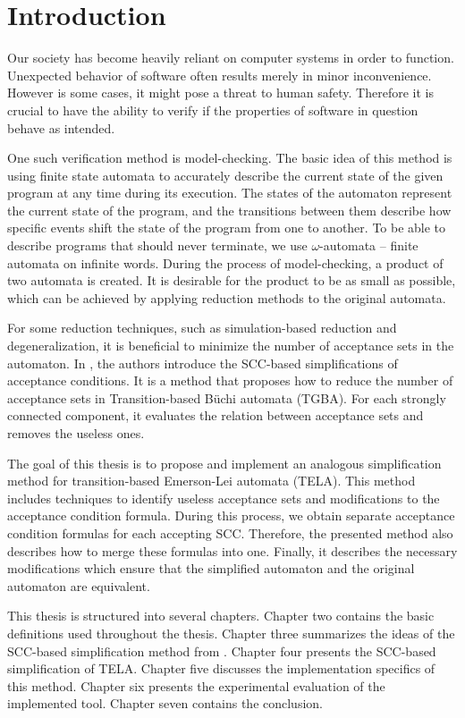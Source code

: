 \documentclass[
  digital, %
  twoside, %
  table,   %
  lof,     %
  lot,     %
]{fithesis3}
\begin{document}
\chapter{Introduction}

Our society has become heavily reliant on computer systems in order to function. Unexpected behavior of software often results merely in minor inconvenience. However is some cases, it might pose a threat to human safety. Therefore it is crucial to have the ability to verify if the properties of software in question behave as intended. 

One such verification method is model-checking. The basic idea of this method is using finite state automata to accurately describe the current state of the given program at any time during its execution. The states of the automaton represent the current state of the program, and the transitions between them describe how specific events shift the state of the program from one to another. To be able to describe programs that should never terminate, we use $\omega$-automata -- finite automata on infinite words. During the process of model-checking, a product of two automata is created. It is desirable for the product to be as small as possible, which can be achieved by applying reduction methods to the original automata. 

For some reduction techniques, such as simulation-based reduction and degeneralization, it is beneficial to minimize the number of acceptance sets in the automaton. In \cite{spin2013}, the authors introduce the SCC-based simplifications of acceptance conditions. It is a method that proposes how to reduce the number of acceptance sets in Transition-based Büchi automata (TGBA). For each strongly connected component, it evaluates the relation between acceptance sets and removes the useless ones. 

The goal of this thesis is to propose and implement an analogous simplification method for transition-based Emerson-Lei automata (TELA).  This method includes techniques to identify useless acceptance sets and modifications to the acceptance condition formula. During this process, we obtain separate acceptance condition formulas for each accepting SCC. Therefore, the presented method also describes how to merge these formulas into one. Finally, it describes the necessary modifications which ensure that the simplified automaton and the original automaton are equivalent.

This thesis is structured into several chapters. Chapter two contains the basic definitions used throughout the thesis. Chapter three summarizes the ideas of the SCC-based simplification method from \cite{spin2013}.  Chapter four presents the SCC-based simplification of TELA. Chapter five discusses the implementation specifics of this method. Chapter six presents the experimental evaluation of the implemented tool. Chapter seven contains the conclusion.
\end{document}
